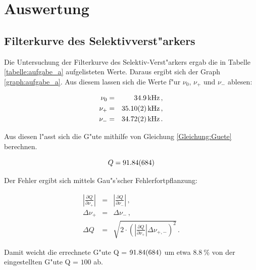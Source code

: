 \section{Auswertung}
	\label{sec:auswertung}

	\subsection{Filterkurve des Selektivverst"arkers} %
	\label{sub:subsection_name}
	
	Die Untersuchung der Filterkurve des Selektiv-Verst"arkers ergab die in Tabelle \ref{tabelle:aufgabe_a} aufgelisteten Werte.
	Daraus ergibt sich der Graph \ref{graph:aufgabe_a}.
	Aus diesem lassen sich die Werte f"ur $\nu_\mathrm{0}$, $\nu_\mathrm{+}$ und $\nu_\mathrm{-}$ ablesen:

	\begin{eqnarray*}
		\nu_\mathrm{0} &=& \SI{34.9}{\kilo\hertz} \, ,\\
		\nu_\mathrm{+} &=& \SI{35.10 (2)}{\kilo\hertz} \, ,\\
		\nu_\mathrm{-} &=& \SI{34.72 (2)}{\kilo\hertz} \, .
	\end{eqnarray*}

	Aus diesen l"asst sich die G"ute mithilfe von Gleichung \eqref{Gleichung:Guete} berechnen.

	\begin{equation*}
		Q = \SI{91.84 (684)}{}
	\end{equation*}

	Der Fehler ergibt sich mittels Gau"s'scher Fehlerfortpflanzung:

	\begin{eqnarray*}
		|\frac{\partial Q}{\partial\nu_\mathrm{+}}| &=& |\frac{\partial Q}{\partial\nu_\mathrm{-}}| \, ,\\
		\Delta \nu_\mathrm{+} &=& \Delta \nu_\mathrm{-} \, ,\\
		\Delta Q &=& \sqrt{ 2 \cdot \left( |\frac{\partial Q}{\partial\nu_\mathrm{+}}| \Delta \nu_\mathrm{+,-} \right)^2} \, .
	\end{eqnarray*}

	Damit weicht die errechnete G"ute Q = $\SI{91.84 (684)}{}$ um etwa $\SI{8.8}{\%}$ von der eingestellten G"ute Q = $100$ ab.

	

